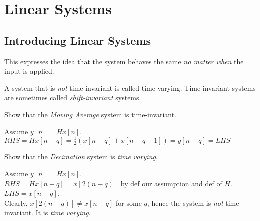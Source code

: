 \chapter{Linear Systems}



\section{Introducing Linear Systems}








This expresses the idea that the system behaves the same \textit{no matter when} the input is applied. 

A system that is \textit{not} time-invariant is called time-varying.
Time-invariant systems are sometimes called \textit{shift-invariant} systems. 



\frmrule 

\begin{example}
Show that the \textit{Moving Average} system is time-invariant.

Assume $y[n] = Hx[n]$. \\
$RHS = Hx[n-q] = \frac{1}{2}(x[n-q] + x[n-q-1]) = y[n-q] = LHS$ \\
\end{example}

\frmrule 

\begin{example}
Show that the \textit{Decimation} system is \textit{time varying}.

Assume $y[n] = Hx[n]$. \\
$RHS = Hx[n-q] = x[2(n-q)]$ by def our assumption and def of $H$. \\
$LHS = x[n-q]$. \\
Clearly, $x[2(n-q)] \neq x[n-q]$ for some $q$, hence 
the system is \textit{not} time-invariant. It is \textit{time varying}. 

\end{example}


\frmrule 




